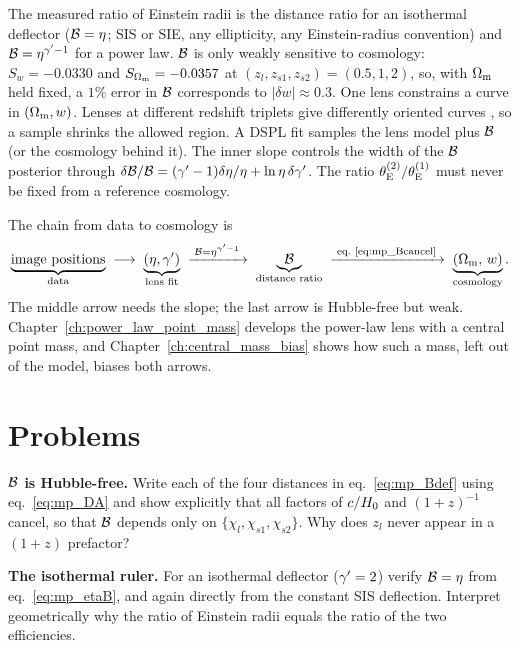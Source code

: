 The measured ratio of Einstein radii is the distance ratio for an
isothermal deflector ($\mathcal{B}=\eta$; SIS or SIE, any
ellipticity, any Einstein-radius convention) and
$\mathcal{B}=\eta^{\gamma'-1}$ for a power law.
$\mathcal{B}$ is only weakly sensitive to cosmology: $S_w=-0.0330$ and
$S_{\Omega_{\mathrm{m}}}=-0.0357$ at $(z_l,z_{s1},z_{s2})=(0.5,1,2)$, so,
with $\Omega_{\mathrm{m}}$ held fixed, a $1\%$ error in $\mathcal{B}$ corresponds
to $|\delta w|\approx0.3$.  One lens constrains a curve in
$(\Omega_{\mathrm{m}},w)$.  Lenses at different redshift triplets give
differently oriented curves \citep{collett_2012}, so a sample
shrinks the allowed region.
A DSPL fit samples the lens model plus $\mathcal{B}$ (or the cosmology
behind it).  The inner slope controls the width of the $\mathcal{B}$
posterior through
$\delta\mathcal{B}/\mathcal{B}=(\gamma'-1)\delta\eta/\eta+\ln\eta\,\delta\gamma'$.
The ratio $\theta_{\mathrm{E}}^{(2)}/\theta_{\mathrm{E}}^{(1)}$ must never be fixed from a
reference cosmology.

The chain from data to cosmology is
\begin{equation*}
  \underbrace{\text{image positions}}_{\text{data}}
  \;\longrightarrow\;
  \underbrace{(\eta,\gamma')}_{\text{lens fit}}
  \;\xrightarrow{\;\mathcal{B}=\eta^{\gamma'-1}\;}\;
  \underbrace{\mathcal{B}}_{\text{distance ratio}}
  \;\xrightarrow{\;\text{eq.~\eqref{eq:mp_Bcancel}}\;}\;
  \underbrace{(\Omega_{\mathrm{m}},\,w)}_{\text{cosmology}} .
\end{equation*}
The middle arrow needs the slope; the last arrow is Hubble-free but
weak.  Chapter~\ref{ch:power_law_point_mass} develops the power-law lens
with a central point mass, and Chapter~\ref{ch:central_mass_bias} shows
how such a mass, left out of the model, biases both arrows.


\section{Problems}
\label{sec:mp_problems}

\begin{exercise}
\label{ex:mp_hubble_free}
\textbf{$\mathcal{B}$ is Hubble-free.}  Write each of the four distances in
eq.~\eqref{eq:mp_Bdef} using eq.~\eqref{eq:mp_DA} and show explicitly that
all factors of $c/H_0$ and $(1+z)^{-1}$ cancel, so that $\mathcal{B}$
depends only on $\{\chi_l,\chi_{s1},\chi_{s2}\}$.  Why does $z_l$ never
appear in a $(1+z)$ prefactor?
\end{exercise}

\begin{exercise}
\label{ex:mp_isothermal}
\textbf{The isothermal ruler.}  For an isothermal deflector ($\gamma'=2$)
verify $\mathcal{B}=\eta$ from eq.~\eqref{eq:mp_etaB}, and again directly
from the constant SIS deflection.  Interpret geometrically why the ratio
of Einstein radii equals the ratio of the two efficiencies.
\end{exercise}

